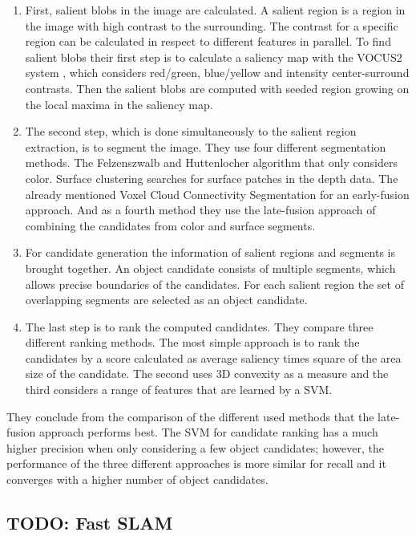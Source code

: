 \documentclass[a4paper,11pt,english]{article}
\begin{document}
\begin{enumerate}
	\item First, salient blobs in the image are calculated.
	A salient region is a region in the image with high contrast to the surrounding.
	The contrast for a specific region can be calculated in respect to different features in parallel.
	To find salient blobs their first step is to calculate a saliency map with the VOCUS2 system \cite{frintrop2015traditional}, which considers red/green, blue/yellow and intensity center-surround contrasts.
	Then the salient blobs are computed with seeded region growing on the local maxima in the saliency map.
	\item The second step, which is done simultaneously to the salient region extraction, is to segment the image.
	They use four different segmentation methods. The Felzenszwalb and Huttenlocher algorithm \cite{felzenszwalb2004efficient} that only considers color. Surface clustering searches for surface patches in the depth data. The already mentioned Voxel Cloud Connectivity Segmentation for an early-fusion approach. And as a fourth method they use the late-fusion approach of combining the candidates from color and surface segments.
	\item For candidate generation the information of salient regions and segments is brought together.
	An object candidate consists of multiple segments, which allows precise boundaries of the candidates.
	For each salient region the set of overlapping segments are selected as an object candidate.
	\item The last step is to rank the computed candidates. They compare three different ranking methods.
	The most simple approach is to rank the candidates by a score calculated as average saliency times square of the area size of the candidate.
	The second uses 3D convexity as a measure and the third considers a range of features that are learned by a SVM.
\end{enumerate}

They conclude from the comparison of the different used methods that the late-fusion approach performs best.
The SVM for candidate ranking has a much higher precision when only considering a few object candidates; however, the performance of the three different approaches is more similar for recall and it converges with a higher number of object candidates.

\subsection{TODO: Fast SLAM}
\label{background:slam}
\end{document}
